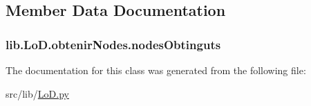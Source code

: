 \subsection{Member Data Documentation}
\hypertarget{classlib_1_1_lo_d_1_1obtenir_nodes_ab81c7dea194c9c7a06118ae7688486fa}{
\subsubsection[{nodes\-Obtinguts}]{\setlength{\rightskip}{0pt plus 5cm}lib.\-Lo\-D.\-obtenir\-Nodes.\-nodes\-Obtinguts}}\label{classlib_1_1_lo_d_1_1obtenir_nodes_ab81c7dea194c9c7a06118ae7688486fa}


The documentation for this class was generated from the following file\-:\begin{DoxyCompactItemize}
\item 
src/lib/\hyperlink{_lo_d_8py}{Lo\-D.\-py}\end{DoxyCompactItemize}

